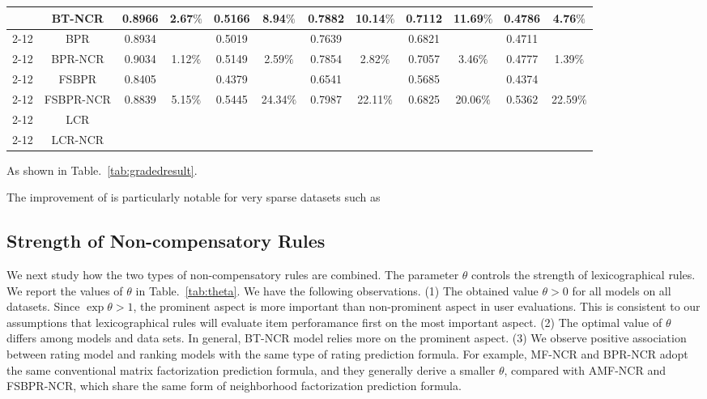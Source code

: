 \documentclass[letterpaper]{article} %
\begin{document}
\begin{table*}[htp]
\begin{center}
\begin{tabular}{|c|c|c|c|c|c|c|c|c|c|c|c|}
	&BT-NCR	&0.8966 &	2.67$\%$	&0.5166 	&8.94$\%$&	0.7882 	&10.14$\%$&	0.7112 	&11.69$\%$	&0.4786 &	4.76$\%$\\\cline{2-12}
	&BPR	&0.8934 	&&	0.5019 	&&	0.7639 	&&	0.6821 	&&	0.4711 	&\\\cline{2-12}
	&BPR-NCR	&0.9034 &	1.12$\%$&	0.5149 	&2.59$\%$&	0.7854 &	2.82$\%$&	0.7057 &	3.46$\%$&	0.4777 	&1.39$\%$\\\cline{2-12}
	&FSBPR	&0.8405 	&&	0.4379 	&&	0.6541 	&&	0.5685 	&&	0.4374 	&\\\cline{2-12}
	&FSBPR-NCR&	0.8839 &	5.15$\%$&	0.5445 	&24.34$\%$&	0.7987 &	22.11$\%$&	0.6825 	&20.06$\%$&	0.5362 &22.59$\%$\\\cline{2-12}
	&LCR	&&&&&&&&&&		\\		\cline{2-12}					
	&LCR-NCR	&&&&&&&&&&	\\\hline															
\end{tabular}
\end{center}
\label{tab:gradedresult}
\end{table*}%

As shown in Table.~\ref{tab:gradedresult}. 

The improvement of is particularly notable for very sparse datasets such as 

\subsection{Strength of Non-compensatory Rules}

We next study how the two types of non-compensatory rules are combined. The parameter $\theta$ controls the strength of lexicographical rules. We report the values of $\theta$ in Table.~\ref{tab:theta}. We have the following observations. (1) The obtained value $\theta>0$ for all models on all datasets. Since $\exp\theta>1$, the prominent aspect is more important than non-prominent aspect in user evaluations. This is consistent to our assumptions that lexicographical rules will evaluate item perforamance first on the most important aspect. (2) The optimal value of $\theta$ differs among models and data sets. In general, BT-NCR model relies more on the prominent aspect. (3) We observe positive association between rating model and ranking models with the same type of rating prediction formula. For example, MF-NCR and BPR-NCR adopt the same conventional matrix factorization prediction formula, and they generally derive a smaller $\theta$, compared with AMF-NCR and FSBPR-NCR, which share the same form of neighborhood factorization prediction formula.  
\end{document}
